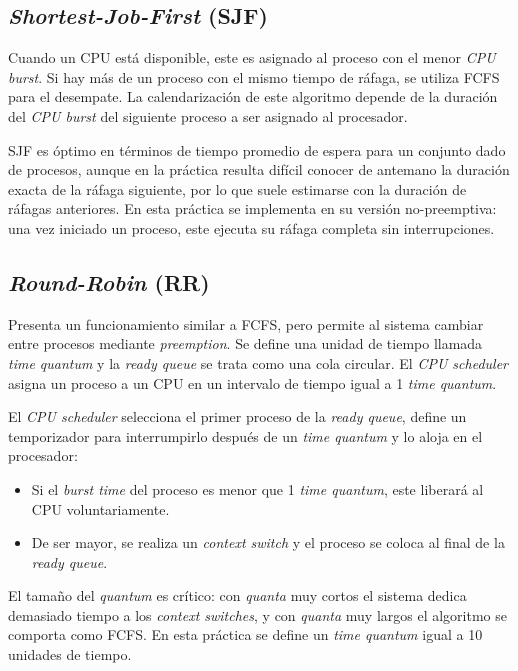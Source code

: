 \documentclass[12pt]{article}
\begin{document}
    \subsection{\textit{Shortest-Job-First} (SJF)}
    Cuando un CPU está disponible, este es asignado al proceso con el menor \textit{CPU burst}. Si hay más de un proceso con el mismo tiempo de ráfaga, se utiliza FCFS para el desempate. La calendarización de este algoritmo depende de la duración del \textit{CPU burst} del siguiente proceso a ser asignado al procesador. \par
    SJF es óptimo en términos de tiempo promedio de espera para un conjunto dado de procesos, aunque en la práctica resulta difícil conocer de antemano la duración exacta de la ráfaga siguiente, por lo que suele estimarse con la duración de ráfagas anteriores. En esta práctica se implementa en su versión no-preemptiva: una vez iniciado un proceso, este ejecuta su ráfaga completa sin interrupciones.

    \subsection{\textit{Round-Robin} (RR)}
    Presenta un funcionamiento similar a FCFS, pero permite al sistema cambiar entre procesos mediante \textit{preemption}. Se define una unidad de tiempo llamada \textit{time quantum} y la \textit{ready queue} se trata como una cola circular. El \textit{CPU scheduler} asigna un proceso a un CPU en un intervalo de tiempo igual a 1 \textit{time quantum}. \par
    El \textit{CPU scheduler} selecciona el primer proceso de la \textit{ready queue}, define un temporizador para interrumpirlo después de un \textit{time quantum} y lo aloja en el procesador:
    \begin{itemize}
        \item Si el \textit{burst time} del proceso es menor que 1 \textit{time quantum}, este liberará al CPU voluntariamente.
        \item De ser mayor, se realiza un \textit{context switch} y el proceso se coloca al final de la \textit{ready queue}.
    \end{itemize}
    El tamaño del \textit{quantum} es crítico: con \textit{quanta} muy cortos el sistema dedica demasiado tiempo a los \textit{context switches}, y con \textit{quanta} muy largos el algoritmo se comporta como FCFS. En esta práctica se define un \textit{time quantum} igual a 10 unidades de tiempo.
\end{document}
